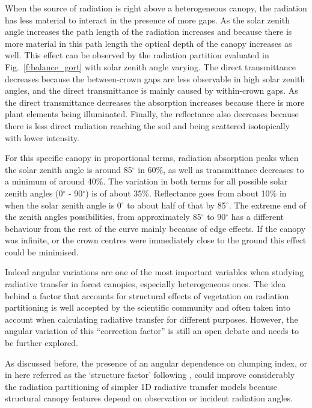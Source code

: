 When the source of radiation is right above a heterogeneous canopy, the radiation has less material to interact in the presence of more gaps. As the solar zenith angle increases the path length of the radiation increases and because there is more material in this path length the optical depth of the canopy increases as well. This effect can be observed by the radiation partition evaluated in Fig.~\ref{f:balance_gort} with solar zenith angle varying. The direct transmittance decreases because the between-crown gaps are less observable in high solar zenith angles, and the direct transmittance is mainly caused by within-crown gaps. As the direct transmittance decreases the absorption increases because there is more plant elements being illuminated. Finally, the reflectance also decreases because there is less direct radiation reaching the soil and being scattered isotopically with lower intensity.

For this specific canopy in proportional terms, radiation absorption peaks when the solar zenith angle is around 85$^{\circ}$ in 60\%, as well as transmittance decreases to a minimum of around 40\%. The variation in both terms for all possible solar zenith angles (0$^{\circ}$ - 90$^{\circ}$) is of about 35\%. Reflectance goes from about 10\% in when the solar zenith angle is 0$^{\circ}$ to about half of that by 85$^{\circ}$. The extreme end of the zenith angles possibilities, from approximately 85$^{\circ}$ to 90$^{\circ}$ has a different behaviour from the rest of the curve mainly because of edge effects. If the canopy was infinite, or the crown centres were immediately close to the ground this effect could be minimised. 

Indeed angular variations are one of the most important variables when studying radiative transfer in forest canopies, especially heterogeneous ones. The idea behind a factor that accounts for structural effects of vegetation on radiation partitioning is well accepted by the scientific community and often taken into account when calculating radiative transfer for different purposes. However, the angular variation of this ``correction factor'' is still an open debate and needs to be further explored. 

As discussed before, the presence of an angular dependence on clumping index, or in here referred as the ‘structure factor’ following \citet{pinty2006}, could improve considerably the radiation partitioning of simpler 1D radiative transfer models because structural canopy features depend on observation or incident radiation angles. 

